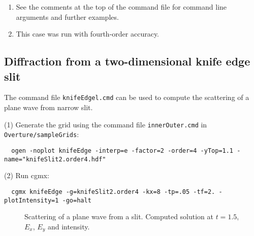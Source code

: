 \begin{enumerate}
  \item See the comments at the top of the command file for command line arguments and further examples.
  \item This case was run with fourth-order accuracy.
\end{enumerate}


\clearpage
\subsection{Diffraction from a two-dimensional knife edge slit} \label{sec:knifeEdge2d}

The command file {\tt knifeEdgel.cmd} can be used to compute the scattering
of a plane wave from narrow slit.

\noindent (1) Generate the grid using the command file {\tt innerOuter.cmd} in {\tt Overture/sampleGrids}:
{\small
\begin{verbatim}
  ogen -noplot knifeEdge -interp=e -factor=2 -order=4 -yTop=1.1 -name="knifeSlit2.order4.hdf"
\end{verbatim}
}
\noindent (2) Run cgmx: 
\begin{verbatim}
  cgmx knifeEdge -g=knifeSlit2.order4 -kx=8 -tp=.05 -tf=2. -plotIntensity=1 -go=halt
\end{verbatim}

{
\begin{figure}[hbt]
\newcommand{\figWidth}{5.5cm}
\newcommand{\trimfig}[2]{\trimFig{#1}{#2}{0.1}{0.05}{.05}{.05}}
\begin{center}
\end{center}
\caption{Scattering of a plane wave from a slit. Computed solution at $t=1.5$, $E_x$, $E_y$ and intensity.}
\label{fig:knifeEdge2d}
\end{figure}
}

